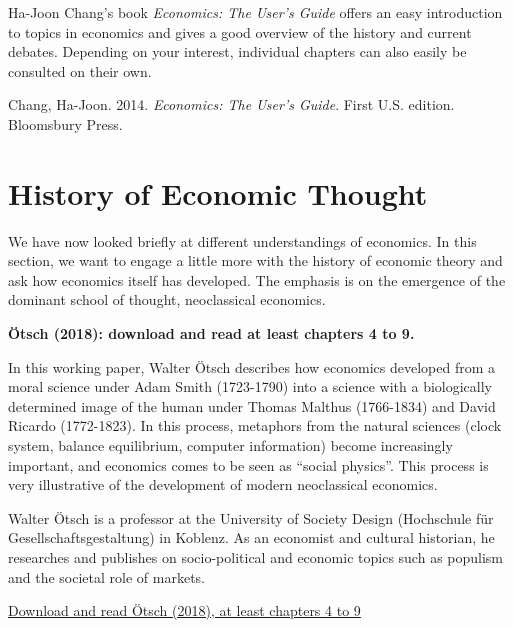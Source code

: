 \documentclass[
  british,
  a4paper,
  DIV=11,
  numbers=noendperiod,
  oneside,
  openany]{scrreprt}
\begin{document}
\begin{tcolorbox}[enhanced jigsaw, arc=.35mm, bottomrule=.15mm, bottomtitle=1mm, breakable, colback=white, colbacktitle=quarto-callout-note-color!10!white, colframe=quarto-callout-note-color-frame, coltitle=black, left=2mm, leftrule=.75mm, opacityback=0, opacitybacktitle=0.6, rightrule=.15mm, title={Further reading}, titlerule=0mm, toprule=.15mm, toptitle=1mm]

Ha-Joon Chang's book \emph{Economics: The User's Guide} offers an easy
introduction to topics in economics and gives a good overview of the
history and current debates. Depending on your interest, individual
chapters can also easily be consulted on their own.

Chang, Ha-Joon. 2014. \emph{Economics: The User's Guide}. First U.S.
edition. Bloomsbury Press.

\end{tcolorbox}

\section{History of Economic Thought}\label{history-of-economic-thought}

We have now looked briefly at different understandings of economics. In
this section, we want to engage a little more with the history of
economic theory and ask how economics itself has developed. The emphasis
is on the emergence of the dominant school of thought, neoclassical
economics.

\begin{tcolorbox}[enhanced jigsaw, arc=.35mm, bottomrule=.15mm, bottomtitle=1mm, breakable, colback=white, colbacktitle=quarto-callout-caution-color!10!white, colframe=quarto-callout-caution-color-frame, coltitle=black, left=2mm, leftrule=.75mm, opacityback=0, opacitybacktitle=0.6, rightrule=.15mm, title={Mandatory reading}, titlerule=0mm, toprule=.15mm, toptitle=1mm]

\textbf{Ötsch (2018): download and read at least chapters 4 to 9.}

In this working paper, Walter Ötsch describes how economics developed
from a moral science under Adam Smith (1723-1790) into a science with a
biologically determined image of the human under Thomas Malthus
(1766-1834) and David Ricardo (1772-1823). In this process, metaphors
from the natural sciences (clock system, balance equilibrium, computer
information) become increasingly important, and economics comes to be
seen as ``social physics''. This process is very illustrative of the
development of modern neoclassical economics.

Walter Ötsch is a professor at the University of Society Design
(Hochschule für Gesellschaftsgestaltung) in Koblenz. As an economist and
cultural historian, he researches and publishes on socio-political and
economic topics such as populism and the societal role of markets.

\href{https://ilias.unibe.ch/go/file/3524254}{Download and read Ötsch
(2018), at least chapters 4 to 9}

\end{tcolorbox}
\end{document}
